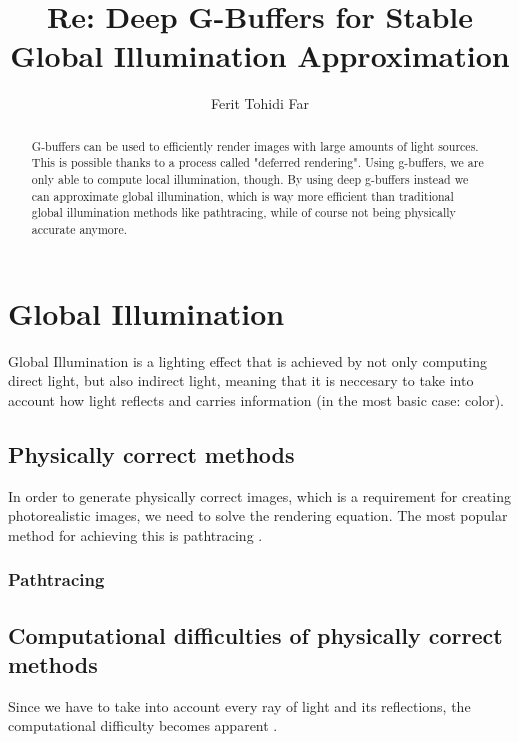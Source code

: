 \documentclass{ACGSeminar}
\begin{document}
\title{Re: Deep G-Buffers for Stable Global Illumination Approximation}

\author{Ferit Tohidi Far}

\maketitle


\begin{abstract}%
G-buffers can be used to efficiently render images with large amounts of light sources. This is possible thanks to a process called "deferred rendering". Using 
g-buffers, we are only able to compute local illumination, though. By using deep g-buffers instead we can approximate global illumination, which is way more 
efficient than traditional global illumination methods like pathtracing, while of course not being physically accurate anymore. 
\end{abstract}

\tableofcontents

\newpage

\label{cha:introduction}
\section{Global Illumination}
	Global Illumination is a lighting effect that is achieved by not only computing direct light, but also indirect light, meaning that it is neccesary to take
	into account how light reflects and carries information (in the most basic case: color).
	\subsection{Physically correct methods}
	In order to generate physically correct images, which is a requirement for creating photorealistic images, we need to solve the rendering equation.
	The most popular method for achieving this is pathtracing \cite{P2PATH}.
	\subsubsection{Pathtracing}
	\subsection{Computational difficulties of physically correct methods}
	Since we have to take into account every ray of light and its reflections, the computational difficulty becomes apparent \cite{DST}.
\end{document}
